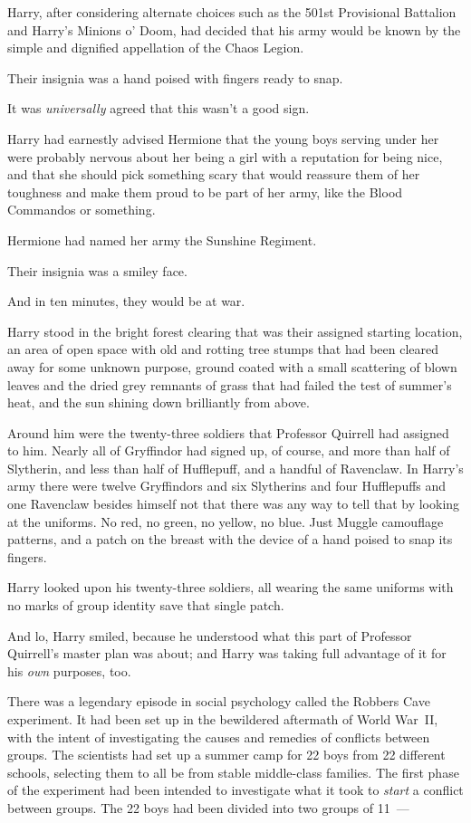 Harry, after considering alternate choices such as the 501st Provisional
Battalion and Harry's Minions o' Doom, had decided that his army would be known
by the simple and dignified appellation of the Chaos Legion.

Their insignia was a hand poised with fingers ready to snap.

It was \emph{universally} agreed that this wasn't a good sign.

Harry had earnestly advised Hermione that the young boys serving under her were
probably nervous about her being a girl with a reputation for being nice, and
that she should pick something scary that would reassure them of her toughness
and make them proud to be part of her army, like the Blood Commandos or
something.

Hermione had named her army the Sunshine Regiment.

Their insignia was a smiley face.

And in ten minutes, they would be at war.

Harry stood in the bright forest clearing that was their assigned starting
location, an area of open space with old and rotting tree stumps that had been
cleared away for some unknown purpose, ground coated with a small scattering of
blown leaves and the dried grey remnants of grass that had failed the test of
summer's heat, and the sun shining down brilliantly from above.

Around him were the twenty-three soldiers that Professor Quirrell had assigned
to him. Nearly all of Gryffindor had signed up, of course, and more than half
of Slytherin, and less than half of Hufflepuff, and a handful of Ravenclaw. In
Harry's army there were twelve Gryffindors and six Slytherins and four
Hufflepuffs and one Ravenclaw besides himself{\el} not that there was any
way to tell that by looking at the uniforms. No red, no green, no yellow, no
blue. Just Muggle camouflage patterns, and a patch on the breast with the
device of a hand poised to snap its fingers.

Harry looked upon his twenty-three soldiers, all wearing the same uniforms with
no marks of group identity save that single patch.

And lo, Harry smiled, because he understood what this part of Professor
Quirrell's master plan was about; and Harry was taking full advantage of it for
his \emph{own} purposes, too.

There was a legendary episode in social psychology called the Robbers Cave
experiment. It had been set up in the bewildered aftermath of World War~II,
with the intent of investigating the causes and remedies of conflicts between
groups. The scientists had set up a summer camp for 22 boys from 22 different
schools, selecting them to all be from stable middle-class families. The first
phase of the experiment had been intended to investigate what it took to
\emph{start} a conflict between groups. The 22 boys had been divided into two
groups of 11~---

